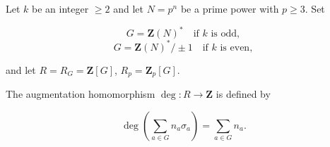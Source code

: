 Let $k$ be an integer $\geq 2$ and let $N = p^n$ be a prime power with $p \geq 3$. Set

$$G = \mathbf{Z}(N)^* \quad \text{if } k \text{ is odd},$$
$$G = \mathbf{Z}(N)^*/\pm 1 \quad \text{if } k \text{ is even},$$

and let $R = R_G = \mathbf{Z}[G]$, $R_p = \mathbf{Z}_p[G]$.

The augmentation homomorphism $\deg: R \to \mathbf{Z}$ is defined by

$$\deg\left( \sum_{a \in G} n_a \sigma_a \right) = \sum_{a \in G} n_a.$$
